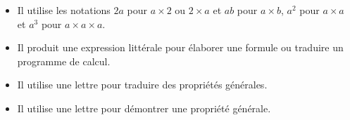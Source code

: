 \begin{prerequis}[Objectifs de 5\up{e}]  
    \begin{itemize}  
        \item Il utilise les notations $2a$ pour $a\times2$ ou $2\times a$ et $ab$ pour $a\times b$, 
        $a^2$ pour $a\times a$ et $a^3$ pour $a\times a\times a$.
        \item Il produit une expression littérale pour élaborer une formule ou traduire un programme de calcul.
        \item Il utilise une lettre pour traduire des propriétés générales.
        \item Il utilise une lettre pour démontrer une propriété générale.
    \end{itemize}
\end{prerequis}

